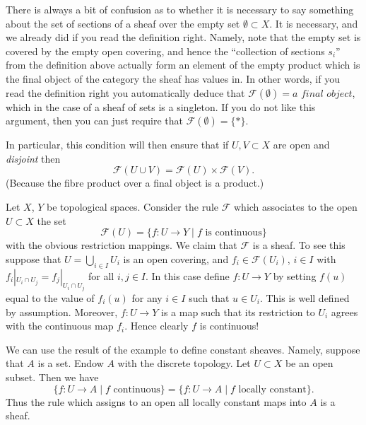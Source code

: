 \begin{remark}
\label{remark-confusion}
There is always a bit of confusion as to whether it is
necessary to say something about the set of sections of
a sheaf over the empty set $\emptyset \subset X$.
It is necessary, and we already did if you read the
definition right. Namely, note that the empty set is
covered by the empty open covering, and hence the ``collection
of sections $s_i$'' from the definition above actually form
an element of the empty product which is the final object
of the category the sheaf has values in. In other words,
if you read the definition right you automatically deduce
that $\mathcal{F}(\emptyset) = \textit{a final object}$,
which in the case of a sheaf of sets is a singleton.
If you do not like this argument, then you can just require
that $\mathcal{F}(\emptyset) = \{*\}$.

\medskip\noindent
In particular, this condition will then ensure that if
$U, V \subset X$ are open and {\it disjoint} then
$$
\mathcal{F}(U \cup V) = \mathcal{F}(U) \times \mathcal{F}(V).
$$
(Because the fibre product over a final object is a product.)
\end{remark}

\begin{example}
\label{example-basic-continuous-maps}
Let $X$, $Y$ be topological spaces.
Consider the rule $\mathcal{F}$ which associates to
the open $U \subset X$ the set
$$
\mathcal{F}(U) = \{ f : U \to Y \mid f \text{ is continuous}\}
$$
with the obvious restriction mappings. We claim that
$\mathcal{F}$ is a sheaf. To see this suppose that
$U = \bigcup_{i\in I} U_i$ is an open covering, and
$f_i \in \mathcal{F}(U_i)$, $i\in I$ with
$f_i |_{U_i \cap U_j} = f_j|_{U_i \cap U_j}$ for all $i, j \in I$.
In this case define $f : U \to Y$ by setting $f(u)$
equal to the value of $f_i(u)$ for any $i \in I$ such that
$u \in U_i$. This is well defined by assumption. Moreover,
$f : U \to Y$ is a map such that its restriction to $U_i$
agrees with the continuous map $f_i$. Hence clearly $f$ is
continuous!
\end{example}

\noindent
We can use the result of the example to define constant
sheaves. Namely, suppose that $A$ is a set. Endow $A$ with
the discrete topology. Let $U \subset X$ be an open subset.
Then we have
$$
\{ f : U \to A \mid f\text{ continuous}\}
=
\{ f : U \to A \mid f\text{ locally constant}\}.
$$
Thus the rule which assigns to an open all locally
constant maps into $A$ is a sheaf.

